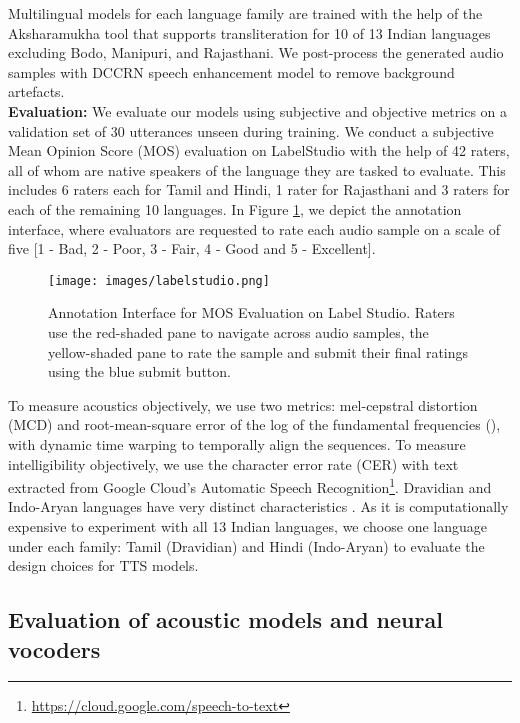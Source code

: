 \documentclass{article}
\begin{document}
Multilingual models for each language family are trained with the help of the Aksharamukha tool that supports transliteration for 10 of 13 Indian languages excluding Bodo, Manipuri, and Rajasthani. 
We post-process the generated audio samples with DCCRN \cite{hu2020dccrn} speech enhancement model to remove background artefacts.
\\
\textbf{Evaluation:}  We evaluate our models using subjective and objective metrics on a validation set of 30 utterances unseen during training. We conduct a subjective Mean Opinion Score (MOS) evaluation on LabelStudio \cite{label-studio} with the help of 42 raters, all of whom are native speakers of the language they are tasked to evaluate. This includes 6 raters each for Tamil and Hindi, 1 rater for Rajasthani and 3 raters for each of the remaining 10 languages. In Figure \ref{fig:labelstudio}, we depict the annotation interface, where evaluators are requested to rate each audio sample on a scale of five [1 - Bad, 2 - Poor, 3 - Fair, 4 - Good and 5 - Excellent]. 



\begin{figure}[htp]
    \centering
    \texttt{[image: images/labelstudio.png]}
    \caption{Annotation Interface for MOS Evaluation on Label Studio. Raters use the red-shaded pane to navigate across audio samples, the yellow-shaded pane to rate the sample and submit their final ratings using the blue submit button.}
    \label{fig:labelstudio}
\end{figure}

To measure acoustics objectively, we use two metrics: mel-cepstral distortion (MCD) \cite{kubichek1993mel} and root-mean-square error of the log of the fundamental frequencies (), with dynamic time warping \cite{salvador2007toward} to temporally align the sequences. To measure intelligibility objectively, we use the character error rate (CER) with text extracted from Google Cloud's Automatic Speech Recognition\footnote{\scriptsize \url{https://cloud.google.com/speech-to-text}}. Dravidian and Indo-Aryan languages have very distinct characteristics \cite{prakash2020generic}.
As it is computationally expensive to experiment with all 13 Indian languages, we choose one language under each family: Tamil (Dravidian) and Hindi (Indo-Aryan) to evaluate the design choices for TTS models. 





\subsection{Evaluation of acoustic models and neural vocoders} \label{subsec:combinations}
\end{document}
